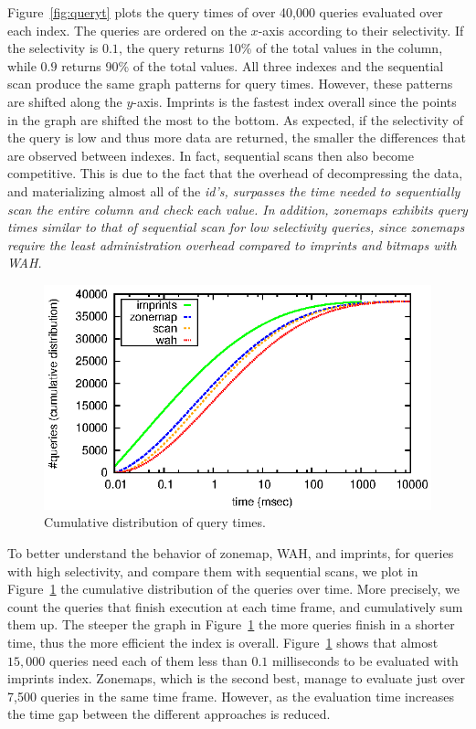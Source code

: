 Figure~\ref{fig:queryt} plots the query times of over 40,000 queries evaluated
over each index. The queries are ordered on the $x$-axis according to their
selectivity. If the selectivity is $0.1$, the query returns 10\%
of the total values in the column, while $0.9$ returns 90\% of the total
values. All three indexes and the sequential scan produce the same graph
patterns for query times. However, these patterns are shifted along the
$y$-axis. Imprints is the fastest index overall since the points in the graph
are shifted the most to the bottom. As expected, if the selectivity of the
query is low and thus more data are returned, the smaller the differences that
are observed between indexes. In fact, sequential scans then also become
competitive. This is due to the fact that the overhead of decompressing
the data, and materializing almost all of the \it{id}'s,
surpasses the time needed to sequentially scan the entire column and check each
value. In addition, zonemaps exhibits query times similar to that of
sequential scan for low selectivity queries, since zonemaps require the least
administration overhead compared to imprints and bitmaps with WAH.

\begin{figure}
\includegraphics{figs/static/cum_queries}
\caption{Cumulative distribution of query times.}
\label{fig:queryc}
\end{figure}

To better understand the behavior of zonemap, WAH, and imprints, for
queries with high selectivity, and compare them with sequential scans, we
plot in Figure~\ref{fig:queryc} the cumulative distribution of the queries over
time. More precisely, we count the queries that finish execution at each time
frame, and cumulatively sum them up. The steeper the graph in
Figure~\ref{fig:queryc} the more queries finish in a shorter time, thus the
more efficient the index is overall. Figure~\ref{fig:queryc} shows that almost
$15,000$ queries need each of them less than $0.1$ milliseconds to be evaluated
with imprints index. Zonemaps, which is the second best, manage to evaluate
just over 7,500 queries in the same time frame. However, as the evaluation
time increases the time gap between the different approaches is reduced.

